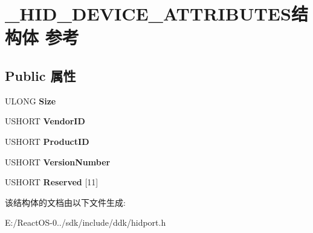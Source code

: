 \hypertarget{struct___h_i_d___d_e_v_i_c_e___a_t_t_r_i_b_u_t_e_s}{}\section{\+\_\+\+H\+I\+D\+\_\+\+D\+E\+V\+I\+C\+E\+\_\+\+A\+T\+T\+R\+I\+B\+U\+T\+E\+S结构体 参考}
\label{struct___h_i_d___d_e_v_i_c_e___a_t_t_r_i_b_u_t_e_s}
\subsection*{Public 属性}
\begin{DoxyCompactItemize}
\item 
\mbox{\label{struct___h_i_d___d_e_v_i_c_e___a_t_t_r_i_b_u_t_e_s_a7f80a572f1a36b841928809649ab0e69}} 
U\+L\+O\+NG {\bfseries Size}
\item 
\mbox{\label{struct___h_i_d___d_e_v_i_c_e___a_t_t_r_i_b_u_t_e_s_a50dcd413683763de8f923d702a88d3f1}} 
U\+S\+H\+O\+RT {\bfseries Vendor\+ID}
\item 
\mbox{\label{struct___h_i_d___d_e_v_i_c_e___a_t_t_r_i_b_u_t_e_s_a1302ec3123863a1d0c10858aecaa7764}} 
U\+S\+H\+O\+RT {\bfseries Product\+ID}
\item 
\mbox{\label{struct___h_i_d___d_e_v_i_c_e___a_t_t_r_i_b_u_t_e_s_a85c2fb26625c6ae9a00c8ed394c72c70}} 
U\+S\+H\+O\+RT {\bfseries Version\+Number}
\item 
\mbox{\label{struct___h_i_d___d_e_v_i_c_e___a_t_t_r_i_b_u_t_e_s_a8b8cdf4ae9be7c6659d6ce0a7d7bfec1}} 
U\+S\+H\+O\+RT {\bfseries Reserved} \mbox{[}11\mbox{]}
\end{DoxyCompactItemize}


该结构体的文档由以下文件生成\+:\begin{DoxyCompactItemize}
\item 
E\+:/\+React\+O\+S-\/0../sdk/include/ddk/hidport.\+h\end{DoxyCompactItemize}
